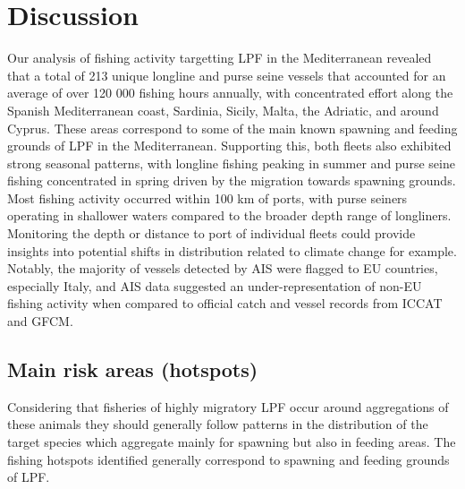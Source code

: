 \chapter{Discussion}
Our analysis of fishing activity targetting LPF in the Mediterranean revealed that a total of 213
unique longline and purse seine vessels that accounted for an average of over 120 000 fishing hours
annually, with concentrated effort along the Spanish Mediterranean coast, Sardinia, Sicily, Malta,
the Adriatic, and around Cyprus. These areas correspond to some of the main known spawning and
feeding grounds of LPF in the Mediterranean. Supporting this, both fleets also exhibited strong
seasonal patterns, with longline fishing peaking in summer and purse seine fishing concentrated in
spring driven by the migration towards spawning grounds. Most fishing activity occurred within 100
km of ports, with purse seiners operating in shallower waters compared to the broader depth range
of longliners. Monitoring the depth or distance to port of individual fleets could provide insights
into potential shifts in distribution related to climate change for example. Notably, the majority
of vessels detected by AIS were flagged to EU countries, especially Italy, and AIS data suggested
an under-representation of non-EU fishing activity when compared to official catch and vessel
records from ICCAT and GFCM.

\section{Main risk areas (hotspots)}
Considering that fisheries of highly migratory LPF occur around aggregations of these animals they
should generally follow patterns in the distribution of the target species which aggregate mainly
for spawning but also in feeding areas. The fishing hotspots identified generally correspond to
spawning and feeding grounds of LPF\@.

\medskip

